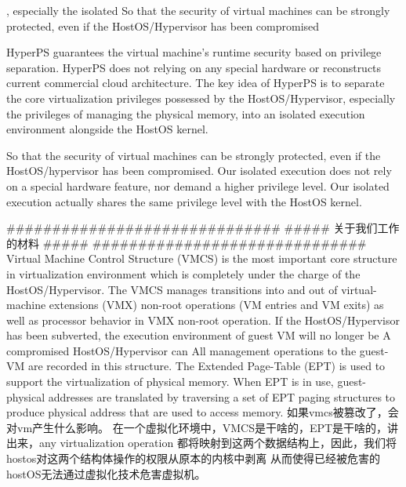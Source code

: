 , especially the isolated
So that the security of virtual machines can be strongly protected, even if the HostOS/Hypervisor has been compromised

HyperPS guarantees the virtual machine's runtime security 
based on privilege separation. 
HyperPS does not relying on any special hardware or reconstructs current commercial cloud architecture. The key idea of HyperPS is to separate the core virtualization privileges possessed by the HostOS/Hypervisor, especially the privileges of managing the physical memory, into an isolated execution environment alongside the HostOS kernel. 

So that the security of virtual machines can be strongly protected, even if the HostOS/hypervisor has been compromised. Our isolated execution does not rely on a special hardware feature, nor demand a higher privilege level. Our isolated execution actually shares the same privilege level with the HostOS kernel. 
\fi



\iffalse
##############################
##### 关于我们工作的材料 #####
##############################
Virtual Machine Control Structure (VMCS) is the most important core structure in virtualization environment which is completely under the charge of the HostOS/Hypervisor. The VMCS manages transitions into and out of virtual-machine extensions (VMX) non-root operations (VM entries and VM exits) as well as processor behavior in VMX non-root operation. If the HostOS/Hypervisor has been subverted, the execution environment of guest VM will no longer be 
A compromised HostOS/Hypervisor can 
All management operations to the guest-VM are recorded in this structure.
The Extended Page-Table (EPT) is used to support the virtualization of physical memory. When EPT is in use, guest-physical addresses are translated by traversing a set of EPT paging structures to produce physical address that are used to access memory.
如果vmcs被篡改了，会对vm产生什么影响。
在一个虚拟化环境中，VMCS是干啥的，EPT是干啥的，讲出来，any virtualization operation 都将映射到这两个数据结构上，因此，我们将hostos对这两个结构体操作的权限从原本的内核中剥离
从而使得已经被危害的hostOS无法通过虚拟化技术危害虚拟机。

